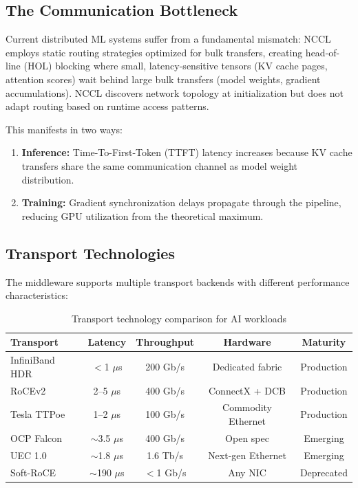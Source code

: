 \documentclass[11pt,letterpaper]{article}
\theoremstyle{definition}
\begin{document}
\subsection{The Communication Bottleneck}

Current distributed ML systems suffer from a fundamental mismatch: NCCL~\cite{nccl} employs static routing strategies optimized for bulk transfers, creating head-of-line (HOL) blocking where small, latency-sensitive tensors (KV cache pages, attention scores) wait behind large bulk transfers (model weights, gradient accumulations). NCCL discovers network topology at initialization but does not adapt routing based on runtime access patterns.

This manifests in two ways:
\begin{enumerate}
    \item \textbf{Inference:} Time-To-First-Token (TTFT) latency increases because KV cache transfers share the same communication channel as model weight distribution.
    \item \textbf{Training:} Gradient synchronization delays propagate through the pipeline, reducing GPU utilization from the theoretical maximum.
\end{enumerate}

\subsection{Transport Technologies}

The middleware supports multiple transport backends with different performance characteristics:

\begin{table}[htbp]
\centering
\caption{Transport technology comparison for AI workloads}
\label{tab:transport-comparison}
\begin{tabular}{@{}lcccc@{}}
\toprule
\textbf{Transport} & \textbf{Latency} & \textbf{Throughput} & \textbf{Hardware} & \textbf{Maturity} \\
\midrule
InfiniBand HDR & $<$1 $\mu$s & 200 Gb/s & Dedicated fabric & Production \\
RoCEv2 & 2--5 $\mu$s & 400 Gb/s & ConnectX + DCB & Production \\
Tesla TTPoe~\cite{ttpoe-hotchips} & 1--2 $\mu$s & 100 Gb/s & Commodity Ethernet & Production \\
OCP Falcon~\cite{ocp-falcon} & $\sim$3.5 $\mu$s & 400 Gb/s & Open spec & Emerging \\
UEC 1.0~\cite{uec2025} & $\sim$1.8 $\mu$s & 1.6 Tb/s & Next-gen Ethernet & Emerging \\
Soft-RoCE & $\sim$190 $\mu$s & $<$1 Gb/s & Any NIC & Deprecated \\
\bottomrule
\end{tabular}
\end{table}
\end{document}
